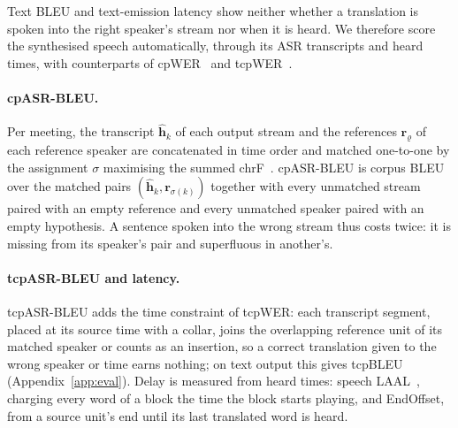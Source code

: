 Text BLEU and text-emission latency show neither whether a translation is spoken into the right speaker's stream nor
when it is heard. We therefore score the synthesised speech automatically, through its ASR transcripts and heard times,
with counterparts of cpWER~\citep{watanabe2020chime6} and tcpWER~\citep{neumann2023meeteval}.

\paragraph{cpASR-BLEU.} Per meeting, the transcript $\hat{\bm{h}}_k$ of each output stream and the references
$\bm{r}_\varrho$ of each reference speaker are concatenated in time order and matched one-to-one by the assignment
$\sigma$ maximising the summed chrF~\citep{popovic2015chrf}. cpASR-BLEU is corpus BLEU over the matched pairs
$(\hat{\bm{h}}_k,\bm{r}_{\sigma(k)})$ together with every unmatched stream paired with an empty reference and every
unmatched speaker paired with an empty hypothesis. A sentence spoken into the wrong stream thus costs twice: it is
missing from its speaker's pair and superfluous in another's.

\paragraph{tcpASR-BLEU and latency.} tcpASR-BLEU adds the time constraint of tcpWER: each transcript segment, placed
at its source time with a collar, joins the overlapping reference unit of its matched speaker or counts as an
insertion, so a correct translation given to the wrong speaker or time earns nothing; on text output this gives
tcpBLEU (Appendix~\ref{app:eval}). Delay is measured from heard times: speech LAAL~\citep{papi2022over}, charging every
word of a block the time the block starts playing, and EndOffset, from a source unit's end until its last translated
word is heard.
